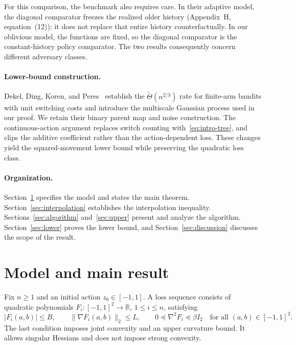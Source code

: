 \documentclass[11pt]{article}
\theoremstyle{definition}
\newcommand{\R}{\mathbb R}
\begin{document}
For this comparison, the benchmark also requires care. In their adaptive model, the diagonal comparator freezes the realized older history (Appendix~H, equation~(12)); it does not replace that entire history counterfactually. In our oblivious model, the functions are fixed, so the diagonal comparator is the constant-history policy comparator. The two results consequently concern different adversary classes.



\paragraph{Lower-bound construction.}
Dekel, Ding, Koren, and Peres~\cite{dekel} establish the $\widetilde\Theta(n^{2/3})$ rate for finite-arm bandits with unit switching costs and introduce the multiscale Gaussian process used in our proof. We retain their binary parent map and noise construction. The continuous-action argument replaces switch counting with~\eqref{eq:intro-tree}, and clips the additive coefficient rather than the action-dependent loss. These changes yield the squared-movement lower bound while preserving the quadratic loss class.

\paragraph{Organization.}
Section~\ref{sec:model} specifies the model and states the main theorem. Section~\ref{sec:interpolation} establishes the interpolation inequality. Sections~\ref{sec:algorithm} and~\ref{sec:upper} present and analyze the algorithm. Section~\ref{sec:lower} proves the lower bound, and Section~\ref{sec:discussion} discusses the scope of the result.

\section{Model and main result}\label{sec:model}

Fix $n\geq1$ and an initial action $z_0\in[-1,1]$. A loss sequence consists of quadratic polynomials $F_i:[-1,1]^2\to\R$, $1\leq i\leq n$, satisfying
\begin{equation}\label{eq:model}
 |F_i(a,b)|\leq B,\qquad
 \|\nabla F_i(a,b)\|_2\leq L,\qquad
 0\preceq\nabla^2F_i\preceq\beta I_2
 \quad\text{for all }(a,b)\in[-1,1]^2.
\end{equation}
The last condition imposes joint convexity and an upper curvature bound. It allows singular Hessians and does not impose strong convexity.
\end{document}
